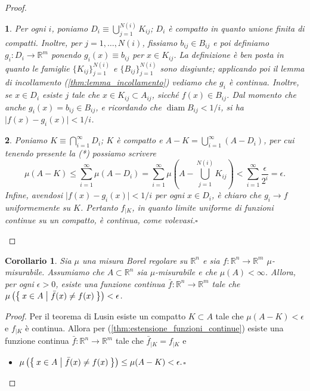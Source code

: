 \documentclass[a4paper,10pt,openright,oneside]{book}
\theoremstyle{theoremstyle}
\newtheorem{corollario}[teorema]{Corollario}
\theoremstyle{theoremstylewoheader}
\theoremstyle{theoremstyle}
\theoremstyle{proofsecstyle}
\newtheorem{proofsec}{}
\theoremstyle{nonumberplain}
\newtheorem{proof}{Dim.}
\newcommand{\RR}{\ensuremath{\mathbb{R}}}
\newcommand{\abs}[1]{\ensuremath{\lvert #1 \rvert}}
\DeclareMathOperator{\diam}{diam}
\renewcommand{\qedsymbol}{\ensuremath{\square}}
\newcommand{\qed}{\unskip\nobreak\hfill\nobreak\hspace{.5em}\qedsymbol}
\newcommand{\mymath}[2]{\begin{itemize}%
  \item[]\hfill\hbox{}\ensuremath{\displaystyle #1}\hfill\ensuremath{\displaystyle #2}%
  \end{itemize}}
\begin{document}
\begin{proof}
\begin{proofsec}
Per ogni $i$, poniamo $D_i \equiv \bigcup_{j=1}^{N(i)} K_{ij}$; $D_i$ è compatto in quanto unione finita di compatti. Inoltre, per $j = 1, \ldots, N(i)$, fissiamo $b_{ij} \in B_{ij}$ e poi definiamo $g_i : D_i \rightarrow \RR^m$ ponendo $g_i(x) \equiv b_{ij}$ per $x \in K_{ij}$. La definizione è ben posta in quanto le famiglie $\{K_{ij}\}_{j=1}^{N(i)}$ e $\{B_{ij}\}_{j=1}^{N(i)}$ sono disgiunte; applicando poi il lemma di incollamento (\ref{thm:lemma_incollamento}) vediamo che $g_i$ è continua. Inoltre, se $x \in D_i$ esiste $j$ tale che $x \in K_{ij} \subset A_{ij}$, sicché $f(x) \in B_{ij}$. Dal momento che anche $g_i(x) = b_{ij} \in B_{ij}$, e ricordando che $\diam B_{ij} < 1/i$, si ha $\abs{f(x) - g_i(x)} < 1/i$.
\end{proofsec}

\begin{proofsec}
Poniamo $K \equiv \bigcap_{i=1}^\infty D_i$; $K$ è compatto e $A - K = \bigcup_{i=1}^\infty (A - D_i)$, per cui tenendo presente la (*) possiamo scrivere
\[
\mu(A - K) \le \sum_{i=1}^\infty \mu(A - D_i) = \sum_{i=1}^\infty \mu\left(A - \bigcup_{j=1}^{N(i)} K_{ij}\right) < \sum_{i=1}^\infty \frac{\epsilon}{2^i} = \epsilon.
\]
Infine, avendosi $\abs{f(x) - g_i(x)} < 1/i$ per ogni $x \in D_i$, è chiaro che $g_i \to f$ uniformemente su $K$. Pertanto $f_{|K}$, in quanto limite uniforme di funzioni continue su un compatto, è continua, come volevasi.\qed
\end{proofsec}
\end{proof}

\begin{corollario}
Sia $\mu$ una misura Borel regolare su $\RR^n$ e sia $f : \RR^n \rightarrow \RR^m$ $\mu$-misurabile. Assumiamo che $A \subset \RR^n$ sia $\mu$-misurabile e che $\mu(A) < \infty$. Allora, per ogni $\epsilon > 0$, esiste una funzione continua $\bar{f} : \RR^n \rightarrow \RR^m$ tale che $\mu\left(\Set{ x \in A | \bar{f}(x) \ne f(x) }\right) < \epsilon$.
\end{corollario}

\begin{proof}
Per il teorema di Lusin esiste un compatto $K \subset A$ tale che $\mu(A - K) < \epsilon$ e $f_{|K}$ è continua. Allora per (\ref{thm:estensione_funzioni_continue}) esiste una funzione continua $\bar{f} : \RR^n \rightarrow \RR^m$ tale che $\bar{f}_{|K} = f_{|K}$ e
\mymath{\mu\left(\Set{ x \in A | \bar{f}(x) \ne f(x) }\right) \le \mu(A - K) < \epsilon.}{\qedsymbol}
\end{proof}
\end{document}
